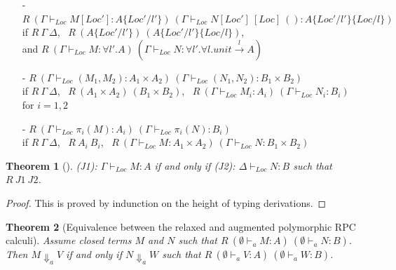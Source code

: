 \documentclass[a4paper]{article}
\theoremstyle{plain}
\newtheorem{theorem}{Theorem}
\theoremstyle{definition}
\newcommand{\evalRPC}[3]{#1\Downarrow_{#2}#3}
\newcommand{\subst}[2]{\{#1/#2\}}
\newcommand{\funL}[1]{\xrightarrow{#1}}
\newcommand{\typing}[4]{#1\vdash_{#2} #3 : #4}
\newcommand{\Loc}{Loc}
\newcommand{\logicalRelText}{R}
\newcommand{\logicalRel}[2]{\logicalRelText \ #1 \ #2}
\newcommand{\logicalRelJudg}[2]{\logicalRelText \ (#1) \ (#2)}
\begin{document}
\begin{itemize}
\item[-]
$\logicalRelJudg
  {\typing{\Gamma}{\Loc}{M[\Loc']}{A\subst{\Loc'}{l'}}}
  {\typing{\Gamma}{\Loc}{N[\Loc'] \ [\Loc] \ ()}{A\subst{\Loc'}{l'}\subst{\Loc}{l}}}$ \\  %
if
$\logicalRel{\Gamma}{\Delta}$, \
$\logicalRel{(A\subst{\Loc'}{l'})}{(A\subst{\Loc'}{l'}\subst{\Loc}{l})}$, \\
and $\logicalRelJudg
  {\typing{\Gamma}{\Loc}{M}{\forall l'.A}}
  {\typing{\Gamma}{\Loc}{N}{\forall l'.\forall l.unit\funL{l}A}}$

\item[-]
$\logicalRelJudg
  {\typing{\Gamma}{\Loc}{(M_1,M_2)}{A_1\times A_2}}
  {\typing{\Gamma}{\Loc}{(N_1,N_2)}{B_1\times B_2}}$ \\
if
$\logicalRel{\Gamma}{\Delta}$, \
$\logicalRel{(A_1\times A_2)}{(B_1\times B_2)}$, \
$\logicalRelJudg
  {\typing{\Gamma}{\Loc}{M_i}{A_i}}
  {\typing{\Gamma}{\Loc}{N_i}{B_i}}$ for $i=1,2$

\item[-]
$\logicalRelJudg
  {\typing{\Gamma}{\Loc}{\pi_i(M)}{A_i}}
  {\typing{\Gamma}{\Loc}{\pi_i(N)}{B_i}}$ \\
if
$\logicalRel{\Gamma}{\Delta}$, \
$\logicalRel{A_i}{B_i}$, \
$\logicalRelJudg
  {\typing{\Gamma}{\Loc}{M}{A_1\times A_2}}
  {\typing{\Gamma}{\Loc}{N}{B_1\times B_2}}$

\end{itemize}




\begin{theorem}[]
(J1): $\typing{\Gamma}{\Loc}{M}{A}$ if and only if 
(J2): $\typing{\Delta}{\Loc}{N}{B}$ such that $\logicalRel{J1}{J2}$.
\label{thm:derivationbetweenrelaxedaugmentedrpc}
\end{theorem}
\begin{proof}
This is proved by indunction on the height of typing derivations.
\end{proof}

\begin{theorem}[Equivalence between the relaxed and augmented polymorphic RPC calculi]
%
Assume closed terms $M$ and $N$ such that
$\logicalRel{(\typing{\emptyset}{a}{M}{A})}{(\typing{\emptyset}{a}{N}{B})}$.
Then
$\evalRPC{M}{a}{V}$ if and only if $\evalRPC{N}{a}{W}$ such that
$\logicalRel{(\typing{\emptyset}{a}{V}{A})}{(\typing{\emptyset}{a}{W}{B})}$.
\label{thm:equivalencebetweenrelaxedaugmentedrpc}
\end{theorem}
\end{document}
